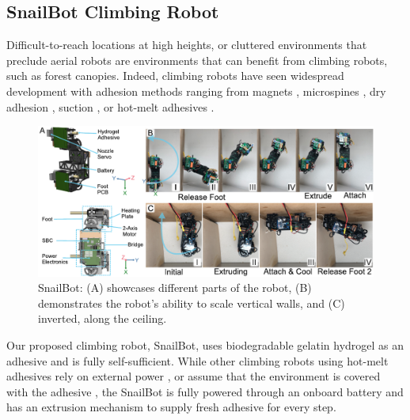 \subsection{SnailBot Climbing Robot}

Difficult-to-reach locations at high heights, or cluttered environments that preclude aerial robots are environments that can benefit from climbing robots, such as forest canopies. Indeed, climbing robots have seen widespread development with adhesion methods ranging from magnets \cite{Hong2022}, microspines \cite{SangbaeKim2005, Lam2012}, dry adhesion \cite{Unver2006a, Kim2007, Liu2018a}, suction \cite{Ge2020, Yoshida2010d}, or hot-melt adhesives \cite{ROCHAT2011, Wang2013, Osswald2013}.


\begin{figure}
  \includegraphics[width=\linewidth]{figures/fig-6-snailbot-placeholder/fig-6-snailbot-placeholder.pdf}
  \caption{SnailBot: (A) showcases different parts of the robot, (B) demonstrates the robot's ability to scale vertical walls, and (C) inverted, along the ceiling.}
  \label{fig:fig6-placeholder}
\end{figure}

Our proposed climbing robot, SnailBot, uses biodegradable gelatin hydrogel as an adhesive and is fully self-sufficient. While other climbing robots using hot-melt adhesives rely on external power \cite{ROCHAT2011, Wang2013, Osswald2013}, or assume that the environment is covered with the adhesive \cite{Wang2013}, the SnailBot is fully powered through an onboard battery and has an extrusion mechanism to supply fresh adhesive for every step.

